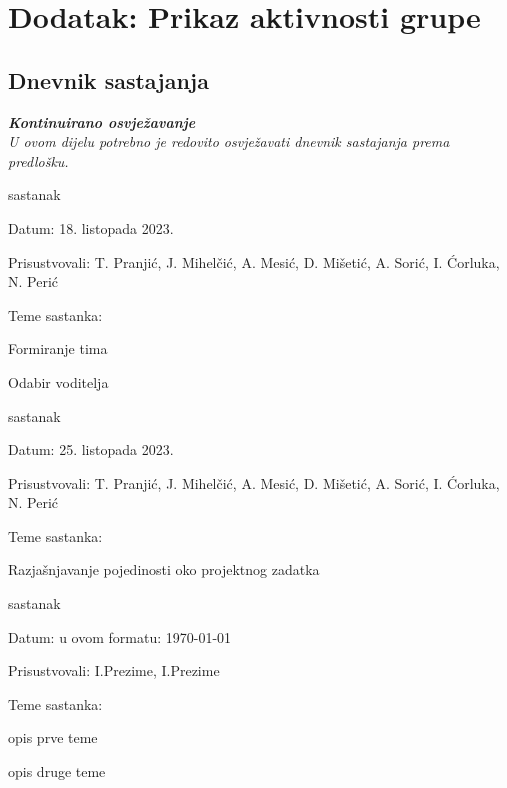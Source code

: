 \chapter*{Dodatak: Prikaz aktivnosti grupe}
		
		\section*{Dnevnik sastajanja}
		
		\textbf{\textit{Kontinuirano osvježavanje}}\\
		
		 \textit{U ovom dijelu potrebno je redovito osvježavati dnevnik sastajanja prema predlošku.}
		
		\begin{packed_enum}
			\item  sastanak
			
			\item[] \begin{packed_item}
				\item Datum: 18. listopada 2023.
				\item Prisustvovali: T. Pranjić, J. Mihelčić, A. Mesić, D. Mišetić, A. Sorić, I. Ćorluka, N. Perić
				\item Teme sastanka:
				\begin{packed_item}
					\item  Formiranje tima
					\item Odabir voditelja
				\end{packed_item}
			\end{packed_item}
			
			\item  sastanak
			\item[] \begin{packed_item}
				\item Datum: 25. listopada 2023.
				\item Prisustvovali: T. Pranjić, J. Mihelčić, A. Mesić, D. Mišetić, A. Sorić, I. Ćorluka, N. Perić
				\item Teme sastanka:
				\begin{packed_item}
					\item  Razjašnjavanje pojedinosti oko projektnog zadatka
				\end{packed_item}
			\end{packed_item}
			
			\item  sastanak
			\item[] \begin{packed_item}
				\item Datum: u ovom formatu: \today
				\item Prisustvovali: I.Prezime, I.Prezime
				\item Teme sastanka:
				\begin{packed_item}
					\item  opis prve teme
					\item  opis druge teme
				\end{packed_item}
			\end{packed_item}
			

\end{packed_enum}
